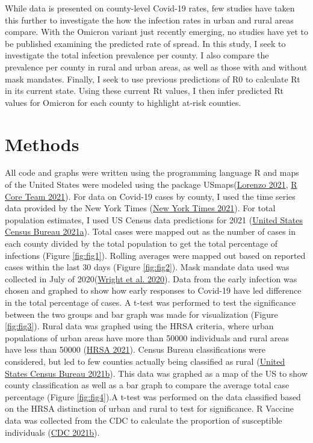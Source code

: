 \documentclass[
  12pt,
]{article}
\begin{document}
While data is presented on county-level Covid-19 rates, few studies have taken this further to investigate the how the infection rates in urban and rural areas compare. With the Omicron variant just recently emerging, no studies have yet to be published examining the predicted rate of spread. In this study, I seek to investigate the total infection prevalence per county. I also compare the prevalence per county in rural and urban areas, as well as those with and without mask mandates. Finally, I seek to use previous predictions of R0 to calculate Rt in its current state. Using these current Rt values, I then infer predicted Rt values for Omicron for each county to highlight at-risk counties.

\hypertarget{methods}{%
\section{Methods}\label{methods}}

All code and graphs were written using the programming language R and maps of the United States were modeled using the package USmaps(\protect\hyperlink{ref-lorenzo_usmap_2021}{Lorenzo 2021}, \protect\hyperlink{ref-r_core_team_r_2021}{R Core Team 2021}). For data on Covid-19 cases by county, I used the time series data provided by the New York Times (\protect\hyperlink{ref-new_york_times_coronavirus_2021}{New York Times 2021}). For total population estimates, I used US Census data predictions for 2021 (\protect\hyperlink{ref-united_states_census_bureau_county_2021}{United States Census Bureau 2021a}). Total cases were mapped out as the number of cases in each county divided by the total population to get the total percentage of infections (Figure \ref{fig:fig1}). Rolling averages were mapped out based on reported cases within the last 30 days (Figure \ref{fig:fig2}). Mask mandate data used was collected in July of 2020(\protect\hyperlink{ref-wright_tracking_2020}{Wright et al. 2020}). Data from the early infection was chosen and graphed to show how early responses to Covid-19 have led difference in the total percentage of cases. A t-test was performed to test the significance between the two groups and bar graph was made for visualization (Figure \ref{fig:fig3}). Rural data was graphed using the HRSA criteria, where urban populations of urban areas have more than 50000 individuals and rural areas have less than 50000 (\protect\hyperlink{ref-hrsa_defining_2021}{HRSA 2021}). Census Bureau classifications were considered, but led to few counties actually being classified as rural (\protect\hyperlink{ref-united_states_census_bureau_2010_2021}{United States Census Bureau 2021b}). This data was graphed as a map of the US to show county classification as well as a bar graph to compare the average total case percentage (Figure \ref{fig:fig4}).A t-test was performed on the data classified based on the HRSA distinction of urban and rural to test for significance. R Vaccine data was collected from the CDC to calculate the proportion of susceptible individuals (\protect\hyperlink{ref-cdc_covid-19_2021}{CDC 2021b}).
\end{document}
